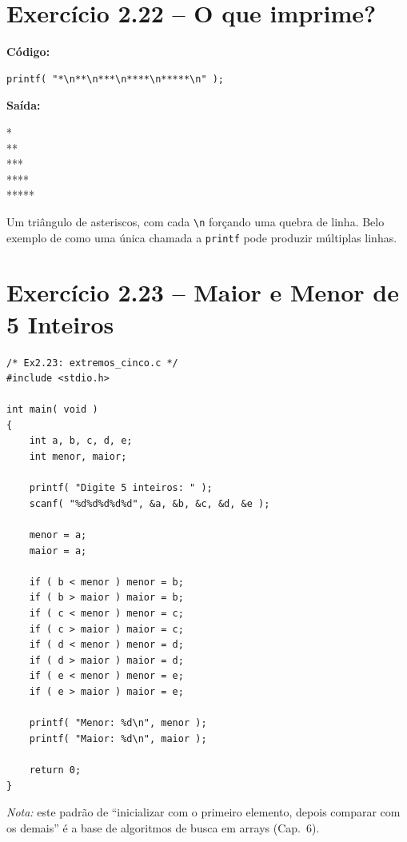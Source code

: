 \documentclass[12pt,a4paper]{article}
\begin{document}
\section{Exercício 2.22 -- O que imprime?}

\begin{respostabox}
\textbf{Código:}
\begin{lstlisting}
printf( "*\n**\n***\n****\n*****\n" );
\end{lstlisting}

\textbf{Saída:}
\begin{saida}
*\\
**\\
***\\
****\\
*****
\end{saida}

Um triângulo de asteriscos, com cada \texttt{\textbackslash n} forçando uma quebra
de linha. Belo exemplo de como uma única chamada a \texttt{printf} pode produzir
múltiplas linhas.
\end{respostabox}

\newpage

\section{Exercício 2.23 -- Maior e Menor de 5 Inteiros}

\begin{respostabox}
\begin{lstlisting}
/* Ex2.23: extremos_cinco.c */
#include <stdio.h>

int main( void )
{
    int a, b, c, d, e;
    int menor, maior;

    printf( "Digite 5 inteiros: " );
    scanf( "%d%d%d%d%d", &a, &b, &c, &d, &e );

    menor = a;
    maior = a;

    if ( b < menor ) menor = b;
    if ( b > maior ) maior = b;
    if ( c < menor ) menor = c;
    if ( c > maior ) maior = c;
    if ( d < menor ) menor = d;
    if ( d > maior ) maior = d;
    if ( e < menor ) menor = e;
    if ( e > maior ) maior = e;

    printf( "Menor: %d\n", menor );
    printf( "Maior: %d\n", maior );

    return 0;
}
\end{lstlisting}

\textit{Nota:} este padrão de ``inicializar com o primeiro elemento, depois
comparar com os demais'' é a base de algoritmos de busca em arrays (Cap.~6).
\end{respostabox}
\end{document}
